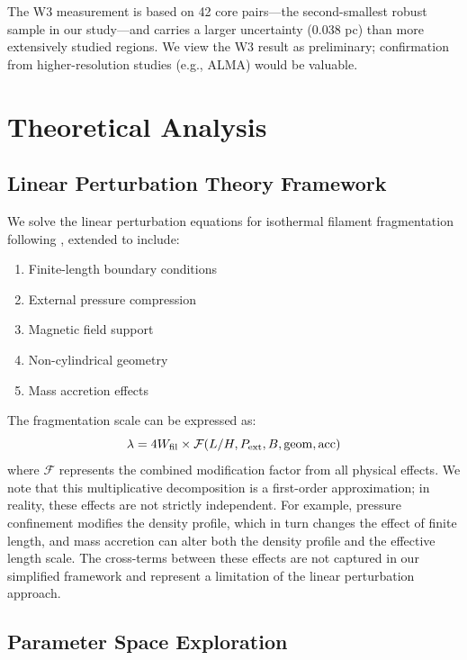\documentclass[11pt,a4paper]{article}
\begin{document}
The W3 measurement is based on 42 core pairs—the second-smallest robust sample in our study—and carries a larger uncertainty (0.038 pc) than more extensively studied regions. We view the W3 result as preliminary; confirmation from higher-resolution studies (e.g., ALMA) would be valuable.

\section{Theoretical Analysis}

\subsection{Linear Perturbation Theory Framework}

We solve the linear perturbation equations for isothermal filament fragmentation following \citet{Inutsuka1992}, extended to include:

\begin{enumerate}
    \item Finite-length boundary conditions \citep{Inutsuka1997}
    \item External pressure compression \citep{Fischera2012}
    \item Magnetic field support \citep{Hennebelle2013}
    \item Non-cylindrical geometry
    \item Mass accretion effects
\end{enumerate}

The fragmentation scale can be expressed as:
\begin{equation}
\lambda = 4W_{\rm fil} \times \mathcal{F}(L/H, P_{\rm ext}, B, {\rm geom}, {\rm acc})
\end{equation}
where $\mathcal{F}$ represents the combined modification factor from all physical effects. We note that this multiplicative decomposition is a first-order approximation; in reality, these effects are not strictly independent. For example, pressure confinement modifies the density profile, which in turn changes the effect of finite length, and mass accretion can alter both the density profile and the effective length scale. The cross-terms between these effects are not captured in our simplified framework and represent a limitation of the linear perturbation approach.

\subsection{Parameter Space Exploration}
\end{document}
